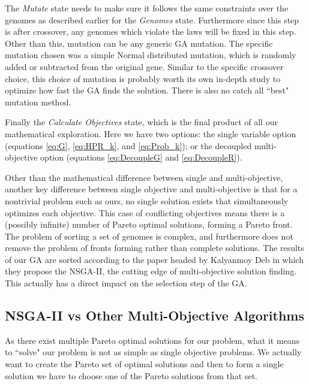 \documentclass[11pt]{article}
\begin{document}
    The \textit{Mutate} state needs to make sure it follows the same constraints over
    the genomes as described earlier for the \textit{Genomes} state. Furthermore since this step is
    after crossover,
    any genomes which violate the laws will be fixed in this step. Other than this,
    mutation can be any generic GA mutation. The specific mutation chosen was a
    simple Normal distributed mutation, which is randomly added or subtracted from
    the original gene. Similar to the specific crossover choice, this choice
    of mutation is probably worth its own in-depth study to optimize how fast
    the GA finds the solution. There is also no catch all ``best" mutation method.

    Finally the \textit{Calculate Objectives} state, which is the final product of all our
    mathematical exploration. Here we have two options: the single variable option (equations
    \ref{eq:G}, \ref{eq:HPR_k}, and \ref{eq:Prob_k}); or the decoupled multi-objective
    option (equations \ref{eq:DecoupleG} and \ref{eq:DecoupleR}).

    Other than the mathematical difference between single and multi-objective,
    another key difference between single objective and multi-objective is that for a
    nontrivial problem such as ours, no single solution exists that simultaneously
    optimizes each objective. This case of conflicting objectives means there is
    a (possibly infinite) number of Pareto optimal solutions, forming a Pareto front.
    The problem of sorting a set of genomes is complex, and furthermore
    does not remove the problem of fronts forming rather than complete solutions.
    The results of our GA are sorted according to the paper headed by
    Kalyanmoy Deb \cite{DebPratapAgarwalMeyarivan} in which they propose the
    NSGA-II, the cutting edge of multi-objective solution finding. This actually
    has a direct impact on the selection step of the GA.

\subsection{NSGA-II vs Other Multi-Objective Algorithms}

    As there exist multiple Pareto optimal solutions for our problem, what it means to ``solve"
    our problem is not as simple as single objective problems. We actually want to create the
    Pareto set of optimal solutions and then to form a single solution we have to choose one of
    the Pareto solutions from that set.
\end{document}
